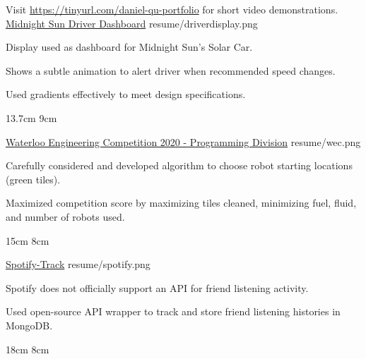 

\begin{cventries}

  Visit \href{https://docs.google.com/document/d/e/2PACX-1vS0EqgEdK7blzAP3eqhoXZXuYXNIMIreo-fD56--8hDs616NmmvpaythZmCKw7Pt4CDEAfRSdoIxmMB/pub}{https://tinyurl.com/daniel-qu-portfolio} for short video demonstrations.
  \\%
  \portfolioEntry
    {\href{https://github.com/uw-midsun/telemetry_xiv}{Midnight Sun Driver Dashboard}} %
    {resume/driverdisplay.png} %
    {
      \begin{cvitems} %
        \item {Display used as dashboard for Midnight Sun's Solar Car.}
        \item {Shows a subtle animation to alert driver when recommended speed changes.}
        \item {Used gradients effectively to meet design specifications.}
      \end{cvitems}
    }
    {13.7cm}
    {9cm}

  \portfolioEntry
    {\href{https://github.com/danielq987/WECF2020}{Waterloo Engineering Competition 2020 - Programming Division}} %
    {resume/wec.png} %
    {
      \begin{cvitems} %
        \item {Carefully considered and developed algorithm to choose robot starting locations (green tiles).}
        \item {Maximized competition score by maximizing tiles cleaned, minimizing fuel, fluid, and number of robots used.}
      \end{cvitems}
    }
    {15cm}
    {8cm}
  
  \newpage

  \portfolioEntry
    {\href{https://github.com/danielq987/spotify-track}{Spotify-Track}} %
    {resume/spotify.png} %
    {
      \begin{cvitems} %
        \item {Spotify does not officially support an API for friend listening activity.}
        \item {Used open-source API wrapper to track and store friend listening histories in MongoDB.}
      \end{cvitems}
    }
    {18cm}
    {8cm}

\end{cventries}
